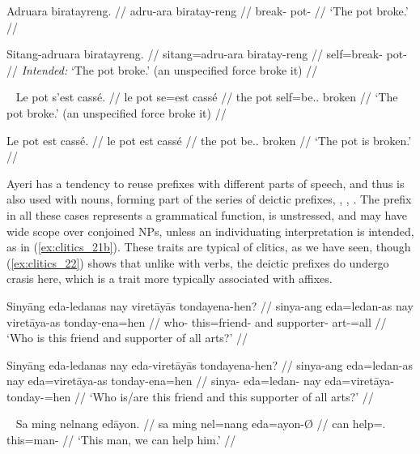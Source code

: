 \pex\label{ex:clitics_19}
\a\label{ex:clitics_19a}\begingl
	\gla Adruara biratayreng. //
	\glb adru-ara biratay-reng //
	\glc break-\TsgI{} pot-\AargI{} //
	\glft `The pot broke.' //
\endgl

\a\label{ex:clitics_19b}\ljudge{*}\begingl
	\gla Sitang-adruara biratayreng. //
	\glb sitang=adru-ara biratay-reng //
	\glc self=break-\TsgI{} pot-\AargI{} //
	\glft \textit{Intended:} `The pot broke.' (an unspecified force broke it) //
\endgl
\xe

\pex~\label{ex:clitics_20}
\a\label{ex:clitics_20a}\begingl{}%
	\gla Le pot s'est cassé. //
	\glb le pot se=est cassé //
	\glc the pot self=be.\Tsg{}.\Prs{} broken //
	\glft `The pot broke.' (an unspecified force broke it) //
\endgl

\a\label{ex:clitics_20b}\begingl
	\gla Le pot est cassé. //
	\glb le pot est cassé //
	\glc the pot be.\Tsg{}.\Prs{} broken //
	\glft `The pot is broken.' //
\endgl
\xe

\label{clitics_prenoun_dem}
Ayeri has a tendency to reuse prefixes with different parts of speech, and thus
 is also used with nouns, forming part of the series of deictic
prefixes, , ,
. The prefix in all these cases represents a grammatical
function, is unstressed, and may have wide scope over conjoined NPs, unless an
individuating interpretation is intended, as in (\ref{ex:clitics_21b}). These
traits are typical of clitics, as we have seen, though (\ref{ex:clitics_22})
shows that unlike with verbs, the deictic prefixes do undergo crasis here, 
which is a trait more typically associated with affixes.

\pex\label{ex:clitics_21}
\a\label{ex:clitics_21a}\begingl
	\gla Sinyāng eda-ledanas nay viretāyās tondayena-hen? //
	\glb sinya-ang eda=ledan-as nay viretāya-as tonday-ena=hen //
	\glc who-\Aarg{} this=friend-\Parg{} and supporter-\Parg{} 
		art-\Gen{}=all //
	\glft `Who is this friend and supporter of all arts?' //
\endgl

\a\label{ex:clitics_21b}\begingl
	\gla Sinyāng eda-ledanas nay eda-viretāyās tondayena-hen? //
	\glb sinya-ang eda=ledan-as nay eda=viretāya-as tonday-ena=hen //
	\glc sinya-\Aarg{} eda=ledan-\Parg{} nay eda=viretāya-\Parg{} 
		tonday-\Gen{}=hen //
	\glft `Who is/are this friend and this supporter of all arts?' //
\endgl
\xe

\ex~\label{ex:clitics_22}\begingl
	\gla Sa ming nelnang edāyon. //
	\glb sa ming nel=nang eda=ayon-Ø //
	\glc \Parg{} can help=\Fpl{}.\Aarg{} this=man-\Top{} //
	\glft `This man, we can help him.' //
\endgl\xe

